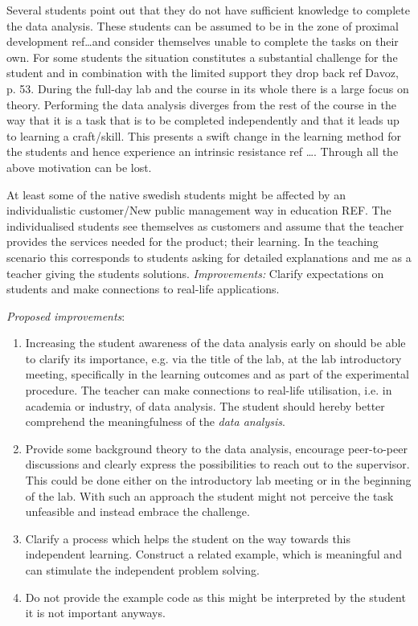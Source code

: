 \documentclass[]{article}
\begin{document}
Several students point out that they do not have sufficient knowledge to complete the data analysis.
These students can be assumed to be in the zone of proximal development ref\dots and consider themselves unable to complete the tasks on their own.
For some students the situation constitutes a substantial challenge for the student and in combination with the limited support they drop back ref Davoz, p. 53.
During the full-day lab and the course in its whole there is a large focus on theory.
Performing the data analysis diverges from the rest of the course in the way that it is a task that is to be completed independently and that it leads up to learning a craft/skill.
This presents a swift change in the learning method for the students and hence experience an intrinsic resistance ref \dots.
Through all the above motivation can be lost.

At least some of the native swedish students might be affected by an individualistic customer/New public management way in education REF.
The individualised students see themselves as customers and assume that the teacher provides the services needed for the product; their learning.
In the teaching scenario this corresponds to students asking for detailed explanations and me as a teacher giving the students solutions.
{\it Improvements:} Clarify expectations on students and make connections to real-life applications.

{\it Proposed improvements}:
\begin{enumerate}
  \item Increasing the student awareness of the data analysis early on should be able to clarify its importance, e.g. via the title of the lab, at the lab introductory meeting, specifically in the learning outcomes and as part of the experimental procedure.
    The teacher can make connections to real-life utilisation, i.e. in academia or industry, of data analysis.
The student should hereby better comprehend the meaningfulness of the {\it data analysis}.
 \item Provide some background theory to the data analysis, encourage peer-to-peer discussions and clearly express the possibilities to reach out to the supervisor.
This could be done either on the introductory lab meeting or in the beginning of the lab.
With such an approach the student might not perceive the task unfeasible and instead embrace the challenge.
  \item Clarify a process which helps the student on the way towards this independent learning.
Construct a related example, which is meaningful and can stimulate the independent problem solving.
  \item Do not provide the example code as this might be interpreted by the student it is not important anyways.
\end{enumerate}




\end{document}
